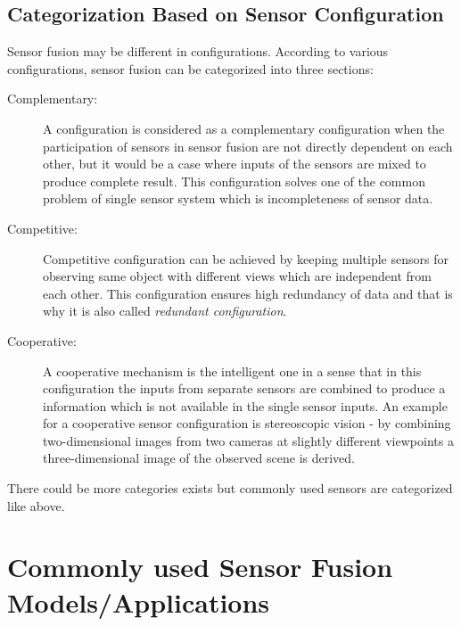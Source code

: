 \subsection{Categorization Based on Sensor Configuration}
Sensor fusion may be different in configurations. According to various configurations, sensor fusion can be categorized into three sections\cite{Wilfried2002}:
\begin{description}
    \item[Complementary:] A configuration is considered as a complementary configuration when the participation of sensors  in sensor fusion are not directly dependent on each other, but it would be a case where inputs of the sensors are mixed to produce complete result. This configuration solves one of the common problem of single sensor system which is incompleteness of sensor data.
    \item[Competitive:] Competitive configuration can be achieved by keeping multiple sensors for observing same object with different views which are independent from each other. This configuration ensures high redundancy of data and that is why it is also called \emph{redundant configuration}\cite{Wilfried2002}.
    \item[Cooperative:] A cooperative mechanism is the intelligent one in a sense that in this configuration the inputs from separate sensors are combined to produce a information which is not available in the single sensor inputs. An example for a cooperative sensor configuration is stereoscopic vision - by combining two-dimensional images from two cameras at slightly different viewpoints a three-dimensional image of the observed scene is derived\cite{Wilfried2002}.
\end{description}

There could be more categories exists but commonly used sensors are categorized like above. 

\section{Commonly used Sensor Fusion Models/Applications}

